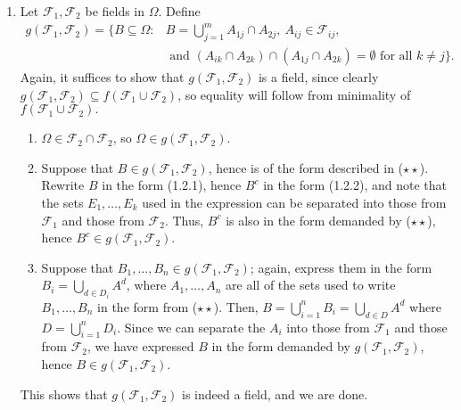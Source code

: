 \documentclass[11pt]{article}
\begin{document}
\begin{enumerate}
        \item Let $\mathcal{F}_1, \mathcal{F}_2$ be fields in $\Omega$.
        Define \begin{align*}
            g(\mathcal{F}_1, \mathcal{F}_2) = \Bigg\{B \subseteq \Omega\colon &B = \bigcup_{j = 1}^m A_{1j} \cap A_{2j},\: A_{ij} \in \mathcal{F}_{ij}, \\
                &\text{ and } (A_{ik} \cap A_{2k}) \cap (A_{1j} \cap A_{2k}) = \emptyset\text{ for all } k \neq j \Bigg\}.
                \tag{$\star\star$}
        \end{align*}
        Again, it suffices to show that $g(\mathcal{F}_1, \mathcal{F}_2)$ is a
        field, since clearly $g(\mathcal{F}_1, \mathcal{F}_2) \subseteq
        f(\mathcal{F}_1 \cup \mathcal{F}_2)$, so equality will follow from
        minimality of $f(\mathcal{F}_1 \cup \mathcal{F}_2).$
        \begin{enumerate}
            \item $\Omega \in \mathcal{F}_2 \cap \mathcal{F}_2$, so $\Omega
            \in g(\mathcal{F}_1, \mathcal{F}_2)$.

            \item Suppose that $B \in g(\mathcal{F}_1, \mathcal{F}_2)$, hence
            is of the form described in ($\star\star$).
            Rewrite $B$ in the form (1.2.1), hence $B^c$ in the form (1.2.2),
            and note that the sets $E_1, \dots, E_k$ used in the expression
            can be separated into those from $\mathcal{F}_1$ and those from
            $\mathcal{F}_2$.
            Thus, $B^c$ is also in the form demanded by ($\star\star$), hence
            $B^c \in g(\mathcal{F}_1, \mathcal{F}_2)$.

            \item Suppose that $B_1, \dots, B_n \in g(\mathcal{F}_1,
            \mathcal{F}_2)$; again, express them in the form $B_i = \bigcup_{d
            \in D_i} A^d$, where $A_1, \dots, A_n$ are all of the sets used to
            write $B_1, \dots, B_n$ in the form from ($\star\star$).
            Then, $B = \bigcup_{i = 1}^n B_i = \bigcup_{d \in D} A^d$ where $D
            = \bigcup_{i = 1}^n D_i$.
            Since we can separate the $A_i$ into those from $\mathcal{F}_1$
            and those from $\mathcal{F}_2$, we have expressed $B$ in the form
            demanded by $g(\mathcal{F}_1, \mathcal{F}_2)$, hence $B \in
            g(\mathcal{F}_1, \mathcal{F}_2)$.
        \end{enumerate}
        This shows that $g(\mathcal{F}_1, \mathcal{F}_2)$ is indeed a field,
        and we are done.
    \end{enumerate}
\end{document}
